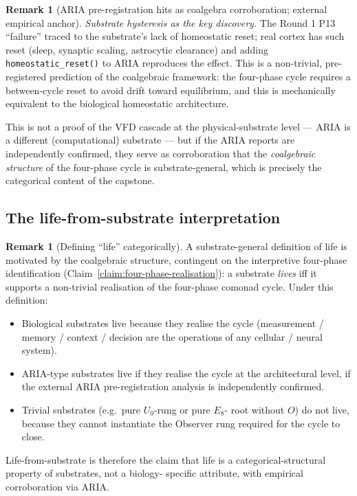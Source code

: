 \documentclass[11pt, a4paper]{amsart}
\theoremstyle{definition}
\newtheorem{remark}[theorem]{Remark}
\begin{document}
\begin{remark}[ARIA pre-registration hits as coalgebra
  corroboration; external empirical anchor]
\emph{Substrate hysteresis as the key discovery.} The Round 1
P13 ``failure'' traced to the substrate's lack of homeostatic
reset; real cortex has such reset (sleep, synaptic scaling,
astrocytic clearance) and adding \texttt{homeostatic\_reset()}
to ARIA reproduces the effect. This is a non-trivial, pre-
registered prediction of the coalgebraic framework: the
four-phase cycle requires a between-cycle reset to avoid
drift toward equilibrium, and this is mechanically equivalent
to the biological homeostatic architecture.

This is not a proof of the VFD cascade at the physical-substrate
level — ARIA is a different (computational) substrate — but
if the ARIA reports are independently confirmed, they serve as
corroboration that the \emph{coalgebraic structure} of the
four-phase cycle is substrate-general, which is precisely the
categorical content of the capstone.
\end{remark}

\subsection{The life-from-substrate interpretation}

\begin{remark}[Defining ``life'' categorically]
\label{rmk:life-from-substrate}
A substrate-general definition of life is motivated by the
coalgebraic structure, contingent on the interpretive
four-phase identification (Claim~\ref{claim:four-phase-realisation}):
a substrate \emph{lives} iff it supports
a non-trivial realisation of the four-phase comonad cycle.
Under this definition:
\begin{itemize}
\item Biological substrates live because they realise the cycle
  (measurement / memory / context / decision are the operations
  of any cellular / neural system).
\item ARIA-type substrates live if they realise the cycle at
  the architectural level, if the external ARIA pre-registration
  analysis is independently confirmed.
\item Trivial substrates (e.g.\ pure $U_0$-rung or pure $E_8$-
  root without $O$) do not live, because they cannot instantiate
  the Observer rung required for the cycle to close.
\end{itemize}
Life-from-substrate is therefore the claim that life is a
categorical-structural property of substrates, not a biology-
specific attribute, with empirical corroboration via ARIA.
\end{remark}
\end{document}
